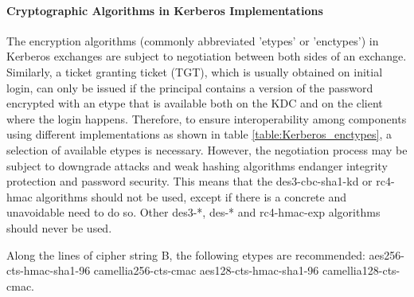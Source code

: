\paragraph{Cryptographic Algorithms in Kerberos Implementations}

The encryption algorithms (commonly abbreviated 'etypes' or 'enctypes') in Kerberos exchanges are subject to negotiation between both sides of an exchange. Similarly, a ticket granting ticket (TGT), which is usually obtained on initial login, can only be issued if the principal contains a version of the password encrypted with an etype that is available both on the KDC and on the client where the login happens. Therefore, to ensure interoperability among components using different implementations as shown in table \ref{table:Kerberos_enctypes}, a selection of available etypes is necessary. However, the negotiation process may be subject to downgrade attacks and weak hashing algorithms endanger integrity protection and password security. This means that the des3-cbc-sha1-kd or rc4-hmac algorithms should not be used, except if there is a concrete and unavoidable need to do so. Other des3-*, des-* and rc4-hmac-exp algorithms should never be used.

Along the lines of cipher string B, the following etypes are recommended: aes256-cts-hmac-sha1-96 camellia256-cts-cmac aes128-cts-hmac-sha1-96 camellia128-cts-cmac.


